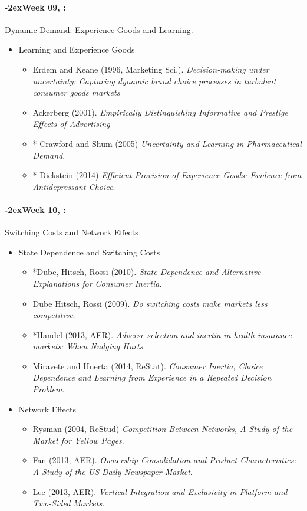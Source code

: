 \documentclass[11pt]{article}
\newcommand{\week}[1]{%
  \paragraph*{\kern-2ex\quad #1, \syldate{\today}:}%
  \ifdim\wd1=\wd\THURSDAY
    \AdvanceDate[7]
  \else
    \AdvanceDate[7]
  \fi%
}
\begin{document}
\week{Week 09} Dynamic Demand: Experience Goods and Learning.
\begin{itemize}
\item Learning and Experience Goods
\begin{itemize}
\item Erdem and Keane (1996, Marketing Sci.). \textit{Decision-making under uncertainty: Capturing dynamic brand choice processes in turbulent consumer goods markets}
\item Ackerberg (2001). \textit{Empirically Distinguishing Informative and Prestige Effects of Advertising}
\item * Crawford and Shum (2005) \textit{Uncertainty and Learning in Pharmaceutical Demand}.
\item * Dickstein (2014) \textit{Efficient Provision of Experience Goods: Evidence from Antidepressant Choice}.
\end{itemize}
\end{itemize}


\week{Week 10} Switching Costs and Network Effects
\begin{itemize}
\item State Dependence and Switching Costs
\begin{itemize}
\item *Dube, Hitsch, Rossi (2010). \textit{State Dependence and Alternative Explanations for Consumer Inertia}.
\item Dube Hitsch, Rossi (2009). \textit{Do switching costs make markets less competitive}.
\item *Handel (2013, AER). \textit{Adverse selection and inertia in health insurance markets: When Nudging Hurts}.
\item Miravete and Huerta (2014, ReStat). \textit{Consumer Inertia, Choice Dependence and Learning from Experience in a Repeated Decision Problem}.
\end{itemize}
\item Network Effects
\begin{itemize}
\item Rysman (2004, ReStud) \textit{Competition Between Networks, A Study of the Market for Yellow Pages}.
\item Fan (2013, AER). \textit{Ownership Consolidation and Product Characteristics: A Study of the US Daily Newspaper Market}.
\item Lee (2013, AER). \textit{Vertical Integration and Exclusivity in Platform and Two-Sided Markets}.
\end{itemize}
\end{itemize}
\end{document}
